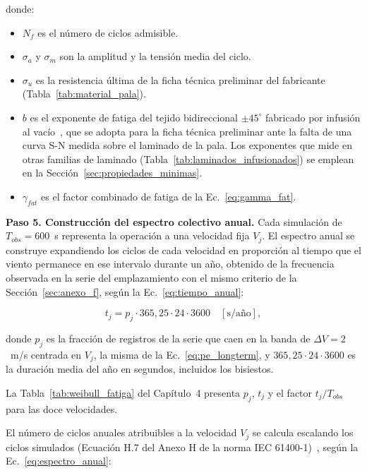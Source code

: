 donde:
\begin{itemize}
    \item $N_f$ es el número de ciclos admisible.
    \item $\sigma_a$ y $\sigma_m$ son la amplitud y la tensión media del ciclo.
    \item $\sigma_u$ es la resistencia última de la ficha técnica preliminar del fabricante (Tabla~\ref{tab:material_pala}).
    \item $b$ es el exponente de fatiga del tejido bidireccional $\pm 45^\circ$ fabricado por infusión al vacío~\parencite{Huh2012}, que se adopta para la ficha técnica preliminar ante la falta de una curva S-N medida sobre el laminado de la pala. Los exponentes que \textcite{Samborsky2012} mide en otras familias de laminado (Tabla~\ref{tab:laminados_infusionados}) se emplean en la Sección~\ref{sec:propiedades_minimas}.
    \item $\gamma_{fat}$ es el factor combinado de fatiga de la Ec.~\ref{eq:gamma_fat}.
\end{itemize}

\medskip
\noindent\textbf{Paso 5. Construcción del espectro colectivo anual.}
Cada simulación de $T_{obs} = 600$~s representa la operación a una velocidad fija $V_j$. El espectro anual se construye expandiendo los ciclos de cada velocidad en proporción al tiempo que el viento permanece en ese intervalo durante un año, obtenido de la frecuencia observada en la serie del emplazamiento con el mismo criterio de la Sección~\ref{sec:anexo_f}, según la Ec.~\ref{eq:tiempo_anual}:

\begin{equation}
    t_j = p_j \cdot 365{,}25 \cdot 24 \cdot 3600 \quad [\text{s/año}],
    \label{eq:tiempo_anual}
\end{equation}

donde $p_j$ es la fracción de registros de la serie que caen en la banda de $\Delta V = 2$~m/s centrada en $V_j$, la misma de la Ec.~\ref{eq:pe_longterm}, y $365{,}25 \cdot 24 \cdot 3600$ es la duración media del año en segundos, incluidos los bisiestos.

La Tabla~\ref{tab:weibull_fatiga} del Capítulo~4 presenta $p_j$, $t_j$ y el factor $t_j / T_{obs}$ para las doce velocidades.

El número de ciclos anuales atribuibles a la velocidad $V_j$ se calcula escalando los ciclos simulados (Ecuación H.7 del Anexo H de la norma IEC 61400-1)~\parencite*{IEC61400-1}, según la Ec.~\ref{eq:espectro_anual}:

